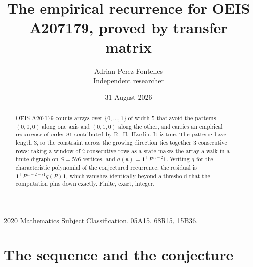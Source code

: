 \documentclass[11pt,a4paper]{article}
\title{The empirical recurrence for OEIS A207179, proved by transfer matrix}
\author{Adrian Perez Fontelles\\ \small Independent researcher}
\date{31 August 2026}
\theoremstyle{plain}
\theoremstyle{definition}
\begin{document}
\maketitle

\begin{abstract}
OEIS A207179 counts arrays over $\{0,\dots,1\}$ of width $5$ that avoid the patterns
$(0,0,0)$ along one axis and $(0,1,0)$ along the other, and carries an empirical recurrence of
order $81$ contributed by R.~H.~Hardin. It is true. The patterns have length $3$, so
the constraint across the growing direction ties together $3$ consecutive rows: taking a
window of $2$ consecutive rows as a state makes the array a walk in a finite digraph
on $S=576$ vertices, and $a(n)=\mathbf{1}^{\!\top}P^{\,n-2}\mathbf{1}$. Writing $q$
for the characteristic polynomial of the conjectured recurrence, the residual is
$\mathbf{1}^{\!\top}P^{\,n-2-81}q(P)\mathbf{1}$, which vanishes identically
beyond a threshold that the computation pins down exactly. Finite, exact, integer.
\end{abstract}

\noindent\small 2020 Mathematics Subject Classification. 05A15, 68R15, 15B36.\normalsize

\section{The sequence and the conjecture}
\end{document}
